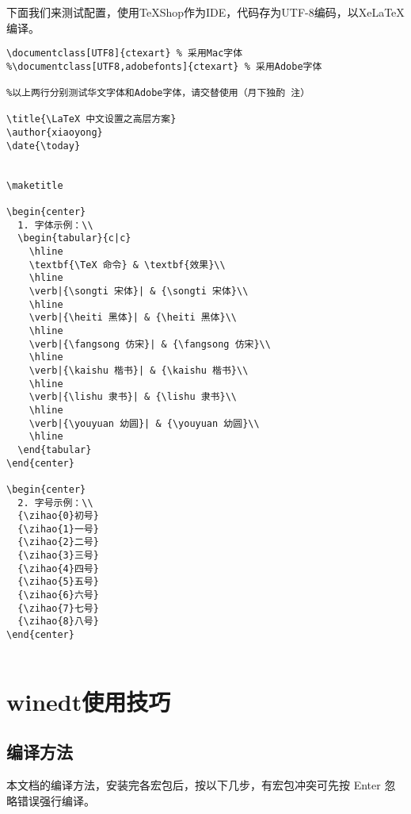 下面我们来测试配置，使用TeXShop作为IDE，代码存为UTF-8编码，以XeLaTeX编译。
\begin{lstlisting}[language={[LaTeX]TeX}]
\documentclass[UTF8]{ctexart} % 采用Mac字体
%\documentclass[UTF8,adobefonts]{ctexart} % 采用Adobe字体

%以上两行分别测试华文字体和Adobe字体，请交替使用（月下独酌 注）

\title{\LaTeX 中文设置之高层方案}
\author{xiaoyong}
\date{\today}


\maketitle

\begin{center}
  1. 字体示例：\\
  \begin{tabular}{c|c}
    \hline
    \textbf{\TeX 命令} & \textbf{效果}\\
    \hline
    \verb|{\songti 宋体}| & {\songti 宋体}\\
    \hline
    \verb|{\heiti 黑体}| & {\heiti 黑体}\\
    \hline
    \verb|{\fangsong 仿宋}| & {\fangsong 仿宋}\\
    \hline
    \verb|{\kaishu 楷书}| & {\kaishu 楷书}\\
    \hline
    \verb|{\lishu 隶书}| & {\lishu 隶书}\\
    \hline
    \verb|{\youyuan 幼圆}| & {\youyuan 幼圆}\\
    \hline
  \end{tabular}
\end{center}

\begin{center}
  2. 字号示例：\\
  {\zihao{0}初号}
  {\zihao{1}一号}
  {\zihao{2}二号}
  {\zihao{3}三号}
  {\zihao{4}四号}
  {\zihao{5}五号}
  {\zihao{6}六号}
  {\zihao{7}七号}
  {\zihao{8}八号}
\end{center}


\end{lstlisting}

\section{winedt使用技巧}
\subsection{编译方法}
本文档的编译方法，安装完各宏包后，按以下几步，有宏包冲突可先按 Enter 忽略错误强行编译。

